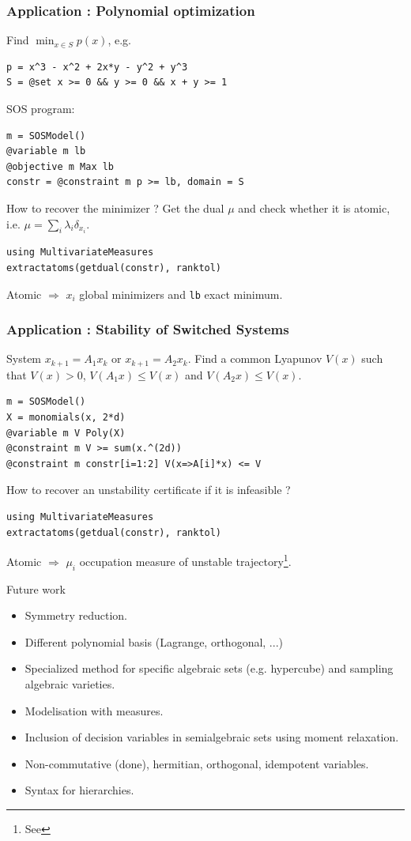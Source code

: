 \documentclass{beamer}
\begin{document}
  \begin{frame}[fragile]
    \frametitle{Application : Polynomial optimization}
      Find $\min_{x \in S} p(x)$, e.g.
\begin{verbatim}
p = x^3 - x^2 + 2x*y - y^2 + y^3
S = @set x >= 0 && y >= 0 && x + y >= 1
\end{verbatim}
      SOS program:
\begin{verbatim}
m = SOSModel()
@variable m lb
@objective m Max lb
constr = @constraint m p >= lb, domain = S
\end{verbatim}
      How to recover the minimizer ?
      Get the dual $\mu$ and check whether it is atomic, i.e.
      \( \mu = \sum_i \lambda_i \delta_{x_i} \).
\begin{verbatim}
using MultivariateMeasures
extractatoms(getdual(constr), ranktol)
\end{verbatim}
      Atomic $\Rightarrow$ $x_i$ global minimizers and \verb|lb| exact minimum.
  \end{frame}
  \begin{frame}[fragile]
    \frametitle{Application : Stability of Switched Systems}
      System $x_{k+1} = A_1x_k$ or $x_{k+1} = A_2x_k$.
      Find a common Lyapunov $V(x)$ such that $V(x) > 0$, $V(A_1x) \leq V(x)$ and $V(A_2x) \leq V(x)$.
\begin{verbatim}
m = SOSModel()
X = monomials(x, 2*d)
@variable m V Poly(X)
@constraint m V >= sum(x.^(2d))
@constraint m constr[i=1:2] V(x=>A[i]*x) <= V
\end{verbatim}
      How to recover an unstability certificate if it is infeasible ?
\begin{verbatim}
using MultivariateMeasures
extractatoms(getdual(constr), ranktol)
\end{verbatim}
      Atomic $\Rightarrow$ $\mu_i$ occupation measure of unstable trajectory\footnote{See }.
  \end{frame}
  \begin{frame}{Future work}
    \begin{itemize}
      \item Symmetry reduction.
      \item Different polynomial basis (Lagrange, orthogonal, ...)
      \item Specialized method for specific algebraic sets (e.g. hypercube) and sampling algebraic varieties.
      \item Modelisation with measures.
      \item Inclusion of decision variables in semialgebraic sets using moment relaxation.
      \item Non-commutative (done), hermitian, orthogonal, idempotent variables.
      \item Syntax for hierarchies.
    \end{itemize}
  \end{frame}
\end{document}
